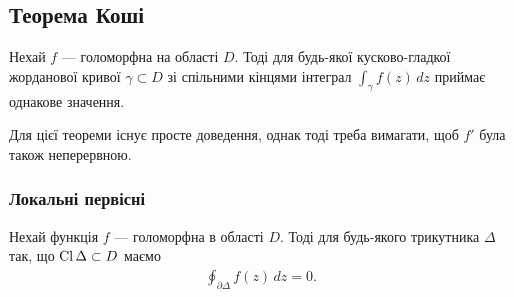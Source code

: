 \documentclass{math_library}
\begin{document}
\subsection{Теорема Коші}
\begin{theorem}
Нехай $f$ --- голоморфна на області $D$. Тоді для будь-якої кусково-гладкої жорданової кривої $\gamma \subset D$ зі спільними кінцями інтеграл $\displaystyle\int_\gamma f(z)\,dz$ приймає однакове значення.
\end{theorem}

Для цієї теореми існує просте доведення, однак тоді треба вимагати, щоб $f'$ була також неперервною.

\subsubsection{Локальні первісні}
\begin{lemma}
Нехай функція $f$ --- голоморфна в області $D$. Тоді для будь-якого трикутника $\Delta$ так, що $\operatorname{Cl} \Delta \subset D$ маємо
\begin{align*}
\oint_{\partial \Delta} f(z)\,dz = 0.
\end{align*}
\end{lemma}
\end{document}
